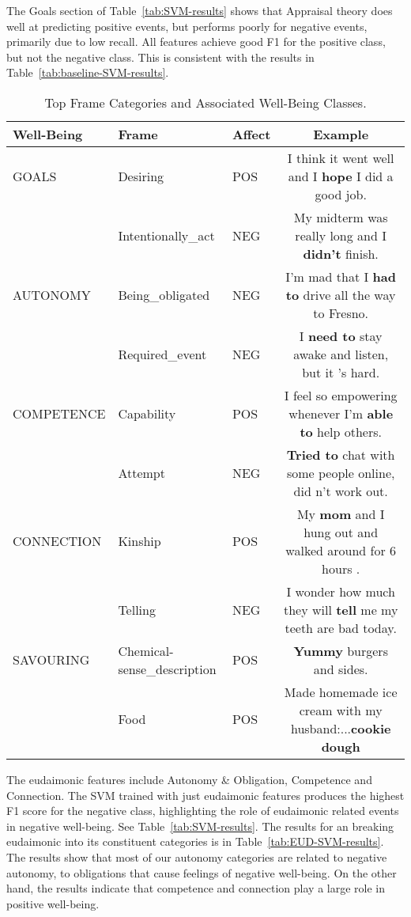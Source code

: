 \documentclass[11pt,letterpaper]{article}
\begin{document}
The Goals section of Table~\ref{tab:SVM-results} shows that
Appraisal theory does well at predicting positive events, but
performs poorly for negative events, primarily due to low recall. All features
achieve good F1 for the
positive class, but not the negative class. This is
consistent with the results in
Table~\ref{tab:baseline-SVM-results}.

\begin{table*}[t]
\begin{small}
\centering
\begin{tabularx}{6.3in}{p{0.85in}|p{1.4in}|p{0.35in} |c}
\toprule
\bf Well-Being &\bf  Frame & \bf Affect & \bf Example \\
\midrule
GOALS & Desiring &  POS & I think it went well and I {\bf hope} I did a good job. \\
 & Intentionally\_act & NEG & My midterm was really long and I  {\bf didn't} finish.\\
\midrule
AUTONOMY & Being\_obligated & NEG & I'm mad that I {\bf had to} drive all the way to Fresno.\\
& Required\_event & NEG & I {\bf need to} stay awake and listen, but it 's hard.\\
\midrule
COMPETENCE & Capability & POS &  I feel so empowering whenever I'm {\bf able to} help others. \\
 & Attempt &  NEG & {\bf Tried to} chat with some people online, did n't work out. \\
\midrule
CONNECTION&  Kinship & POS & My  {\bf mom} and I hung out and walked around for 6 hours .\\
  & Telling & NEG & I wonder how much they will {\bf tell} me my teeth are bad today.\\
\midrule
SAVOURING & Chemical-sense\_description& POS & {\bf Yummy} burgers and sides.\\
 & Food & POS & Made homemade ice cream with my husband:...{\bf cookie dough}\\
\bottomrule
\end{tabularx}
\end{small}
\caption{\label{tab:frame-examples} Top Frame Categories and Associated Well-Being Classes. }
\end{table*}


The {\sc eudaimonic} features include Autonomy \& Obligation,
Competence and Connection. The SVM trained with just eudaimonic
features produces the highest F1 score for the negative class,
highlighting the role of eudaimonic related events in negative
well-being. See Table~\ref{tab:SVM-results}. The results for an
breaking eudaimonic into its constituent
categories is in Table~\ref{tab:EUD-SVM-results}. The results
show that most of our autonomy categories are related to negative
autonomy, to obligations that cause feelings of negative
well-being. On the other hand, the results indicate that competence
and connection play a large role in positive well-being.
\end{document}
